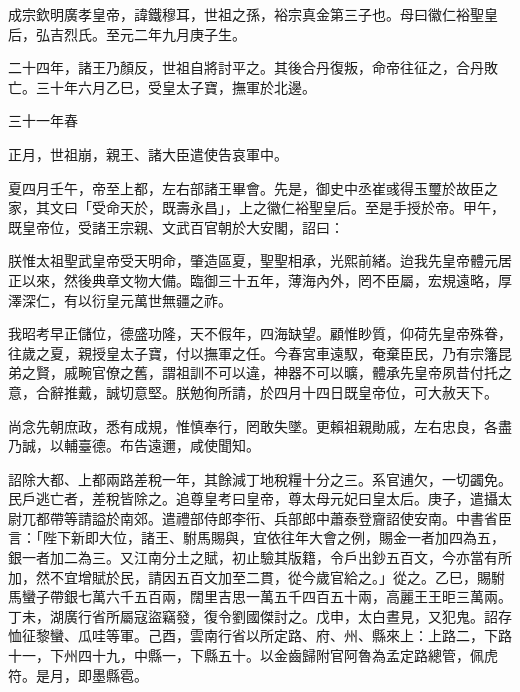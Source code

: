 
\begin{pinyinscope}

 成宗欽明廣孝皇帝，諱鐵穆耳，世祖之孫，裕宗真金第三子也。母曰徽仁裕聖皇后，弘吉烈氏。至元二年九月庚子生。



 二十四年，諸王乃顏反，世祖自將討平之。其後合丹復叛，命帝往征之，合丹敗亡。三十年六月乙巳，受皇太子寶，撫軍於北邊。



 三十一年春



 正月，世祖崩，親王、諸大臣遣使告哀軍中。



 夏四月壬午，帝至上都，左右部諸王畢會。先是，御史中丞崔彧得玉璽於故臣之家，其文曰「受命天於，既壽永昌」，上之徽仁裕聖皇后。至是手授於帝。甲午，既皇帝位，受諸王宗親、文武百官朝於大安閣，詔曰：



 朕惟太祖聖武皇帝受天明命，肇造區夏，聖聖相承，光熙前緒。迨我先皇帝體元居正以來，然後典章文物大備。臨御三十五年，薄海內外，罔不臣屬，宏規遠略，厚澤深仁，有以衍皇元萬世無疆之祚。



 我昭考早正儲位，德盛功隆，天不假年，四海缺望。顧惟眇質，仰荷先皇帝殊眷，往歲之夏，親授皇太子寶，付以撫軍之任。今春宮車遠馭，奄棄臣民，乃有宗籓昆弟之賢，戚畹官僚之舊，謂祖訓不可以違，神器不可以曠，體承先皇帝夙昔付托之意，合辭推戴，誠切意堅。朕勉徇所請，於四月十四日既皇帝位，可大赦天下。



 尚念先朝庶政，悉有成規，惟慎奉行，罔敢失墜。更賴祖親勛戚，左右忠良，各盡乃誠，以輔臺德。布告遠邇，咸使聞知。



 詔除大都、上都兩路差稅一年，其餘減丁地稅糧十分之三。系官逋欠，一切蠲免。民戶逃亡者，差稅皆除之。追尊皇考曰皇帝，尊太母元妃曰皇太后。庚子，遣攝太尉兀都帶等請謚於南郊。遣禮部侍郎李衎、兵部郎中蕭泰登齎詔使安南。中書省臣言：「陛下新即大位，諸王、駙馬賜與，宜依往年大會之例，賜金一者加四為五，銀一者加二為三。又江南分土之賦，初止驗其版籍，令戶出鈔五百文，今亦當有所加，然不宜增賦於民，請因五百文加至二貫，從今歲官給之。」從之。乙巳，賜駙馬蠻子帶銀七萬六千五百兩，闊里吉思一萬五千四百五十兩，高麗王王昛三萬兩。丁未，湖廣行省所屬寇盜竊發，復令劉國傑討之。戊申，太白晝見，又犯鬼。詔存恤征黎蠻、瓜哇等軍。己酉，雲南行省以所定路、府、州、縣來上：上路二，下路十一，下州四十九，中縣一，下縣五十。以金齒歸附官阿魯為孟定路總管，佩虎符。是月，即墨縣雹。




\end{pinyinscope}
